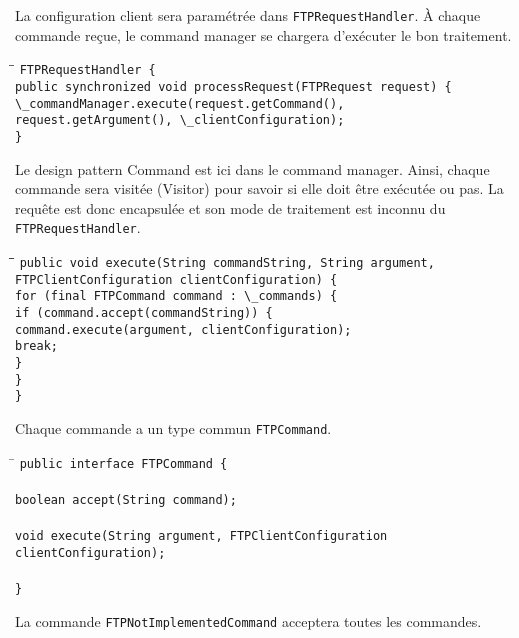 La configuration client sera paramétrée dans \verb+FTPRequestHandler+.
À chaque commande reçue, le command manager se chargera d'exécuter le bon traitement.

\begin{tabbing}
\hspace{1cm}\=\hspace{1cm}\=\kill
\verb+FTPRequestHandler {+\\
	\>\verb+public synchronized void processRequest(FTPRequest request) {+\\
	\>\>\verb+\_commandManager.execute(request.getCommand(),+\\ 	\>\>\verb+request.getArgument(), \_clientConfiguration);+\\
\verb+}+
\end{tabbing}

Le design pattern Command est ici dans le command manager. Ainsi, chaque commande sera visitée (Visitor) pour savoir si elle doit être exécutée ou pas. La requête est donc encapsulée et son mode de traitement est inconnu du \verb+FTPRequestHandler+.

\begin{tabbing}
\hspace{1cm}\=\hspace{1cm}\=\hspace{1cm}\=\kill
\verb+public void execute(String commandString, String argument,+\\
\>\>\verb+FTPClientConfiguration clientConfiguration) {+\\
		\>\verb+for (final FTPCommand command : \_commands) {+\\
			\>\>\verb+if (command.accept(commandString)) {+\\
				\>\>\>\verb+command.execute(argument, clientConfiguration);+\\
				\>\>\>\verb+break;+\\
			\>\>\verb+}+\\
		\>\verb+}+\\
	\verb+}+\\
\end{tabbing}
Chaque commande a un type commun \verb+FTPCommand+.

\begin{tabbing}
\hspace{1cm}\=\kill
\verb+public interface FTPCommand {+\\
\\
    \>\verb+boolean accept(String command);+\\
\\
    \>\verb+void execute(String argument, FTPClientConfiguration clientConfiguration);+\\
\\
\verb+}+
\end{tabbing}
La commande \verb+FTPNotImplementedCommand+ acceptera toutes les commandes.

